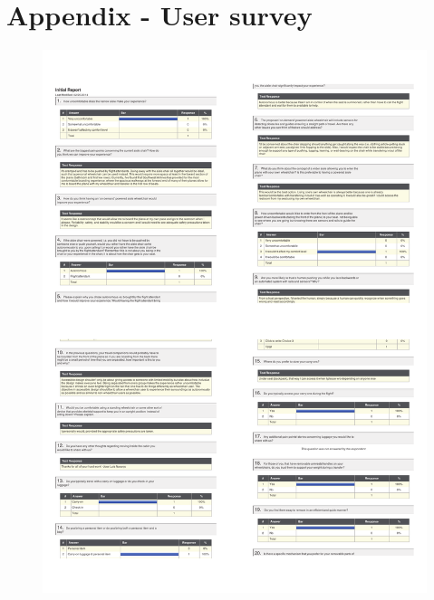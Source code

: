 \chapter{Appendix - User survey}

\begin{figure}[h]
  \centering
     \includegraphics[scale=0.6]{images/Response1.pdf}
 \label{fig:Response1}
\end{figure}

